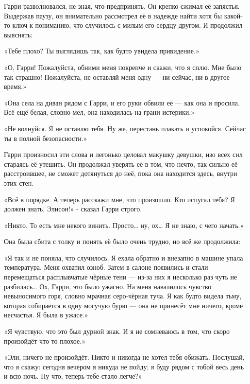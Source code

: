 \documentclass[a4paper,12pt]{book}
\begin{document}
\par
Гарри разволновался, не зная, что предпринять. Он крепко сжимал её запястья. Выдержав паузу, он внимательно рассмотрел её в надежде найти хотя бы какой-то ключ к пониманию, что случилось с милым его сердцу другом. И продолжил выяснять:
\par
«Тебе плохо? Ты выглядишь так, как будто увидела привидение.»
\par
«О, Гарри! Пожалуйста, обними меня покрепче и скажи, что я сплю. Мне было так страшно! Пожалуйста, не оставляй меня одну — ни сейчас, ни в другое время.»
\par
«Она села на диван рядом с Гарри, и его руки обвили её — как она и просила. Всё ещё белая, словно мел, она находилась на грани истерики.»
\par
«Не волнуйся. Я не оставлю тебя. Ну же, перестань плакать и успокойся. Сейчас ты в полной безопасности.»
\par
Гарри произносил эти слова и легонько целовал макушку девушки, изо всех сил стараясь её утешить. Он продолжал уверять её в том, что нечто, так сильно её расстроившее, не сможет дотянуться до неё, пока она находится здесь, внутри этих стен.
\par
«Всё в порядке. А теперь расскажи мне, что произошло. Кто испугал тебя? Я должен знать, Элисон!» - сказал Гарри строго.
\par
«Никто. То есть мне некого винить. Просто… ну, ох… Я не знаю, с чего начать.»
\par
Она была сбита с толку и понять её было очень трудно, но всё же продолжила:
\par
«Я так и не поняла, что случилось. Я ехала обратно и внезапно в машине упала температура. Меня охватил озноб. Затем в салоне появились и стали перемещаться расплывчатые чёрные тени — из-за них я несколько раз чуть не разбилась… Ох, Гарри, это было ужасно. На меня навалилось чувство невыносимого горя, словно мрачная серо-чёрная туча. Я как будто видела тьму, которая собирается в одну могучую бурю — она не принесёт мне ничего, кроме несчастья. Я была в ужасе.»
\par
«Я чувствую, что это был дурной знак. И я не сомневаюсь в том, что скоро произойдёт что-то плохое.»
\par
«Эли, ничего не произойдёт. Никто и никогда не хотел тебя обижать. Послушай, что я скажу: сегодня вечером я никуда не пойду; я буду рядом с тобой весь день и всю ночь. Ну что, теперь тебе стало легче?»\\
\par
\end{document}
